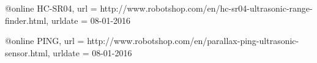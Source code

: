 @online{ HC-SR04,
url = {http://www.robotshop.com/en/hc-sr04-ultrasonic-range-finder.html},
  urldate = {08-01-2016}
}

@online{ PING,
url = {http://www.robotshop.com/en/parallax-ping-ultrasonic-sensor.html},
  urldate = {08-01-2016}
}

